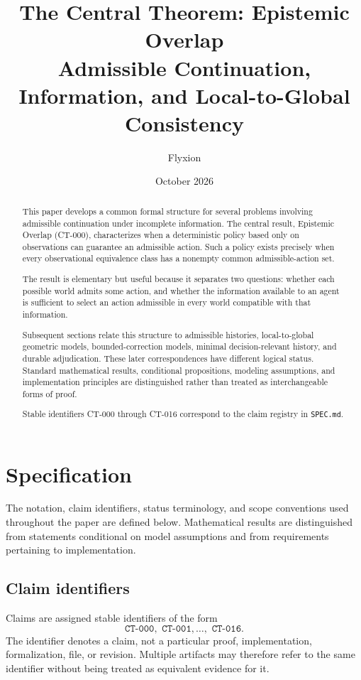\documentclass[11pt]{article}
\title{\textbf{The Central Theorem: Epistemic Overlap}\\
Admissible Continuation, Information, and Local-to-Global Consistency}
\author{Flyxion}
\date{October 2026}
\theoremstyle{definition}
\theoremstyle{remark}
\begin{document}
\maketitle

\begin{abstract}
This paper develops a common formal structure for several problems involving
admissible continuation under incomplete information. The central result,
Epistemic Overlap (CT-000), characterizes when a deterministic policy based
only on observations can guarantee an admissible action. Such a policy exists
precisely when every observational equivalence class has a nonempty common
admissible-action set.

The result is elementary but useful because it separates two questions:
whether each possible world admits some action, and whether the information
available to an agent is sufficient to select an action admissible in every
world compatible with that information.

Subsequent sections relate this structure to admissible histories,
local-to-global geometric models, bounded-correction models, minimal
decision-relevant history, and durable adjudication. These later
correspondences have different logical status. Standard mathematical results,
conditional propositions, modeling assumptions, and implementation principles
are distinguished rather than treated as interchangeable forms of proof.

Stable identifiers CT-000 through CT-016 correspond to the claim registry in
\texttt{SPEC.md}.
\end{abstract}

\section{Specification}


The notation, claim identifiers, status terminology, and scope conventions used throughout the paper are defined below. Mathematical results are distinguished from statements conditional on model assumptions and from requirements pertaining to implementation.

\subsection{Claim identifiers}

Claims are assigned stable identifiers of the form
\[
  \texttt{CT-000},\texttt{ CT-001},\ldots,\texttt{ CT-016}.
\]
The identifier denotes a claim, not a particular proof, implementation,
formalization, file, or revision. Multiple artifacts may therefore refer to
the same identifier without being treated as equivalent evidence for it.
\end{document}
